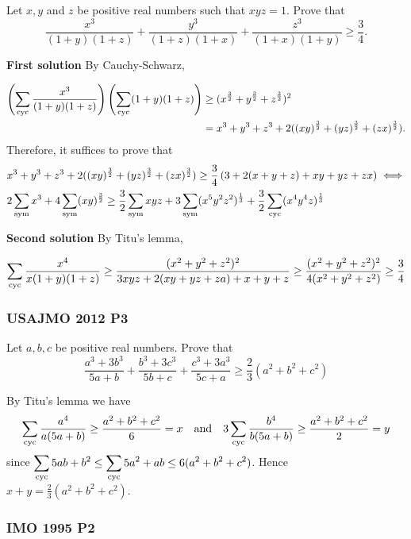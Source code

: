 \begin{problem}
Let $x,y$ and $z$ be positive real numbers such that $xyz=1$. Prove that
\[
	\frac{x^{3}}{(1 + y)(1 + z)}+\frac{y^{3}}{(1 + z)(1 + x)}+\frac{z^{3}}{(1 + x)(1 + y)}
	\geq \frac{3}{4}.
\]
\end{problem}

\textcolor{color1}{\textbf{First solution}} By Cauchy-Schwarz,

\begin{align*}
	\left(\sum_{\text{cyc}} \frac{x^3}{(1+y)(1+z)}\right)\left(\sum_{\text{cyc}} (1+y)(1+z)\right) & \geq (x^{\frac{3}{2}}
	+ y^{\frac{3}{2}} + z^{\frac{3}{2}})^2                                                       \\ & = x^3+y^3+z^3+2((xy)^{\frac{3}{2}}+(yz)^{\frac{3}{2}}+(zx)^{\frac{3}{2}}).
\end{align*}
Therefore, it suffices to prove that
\begin{align*}
	 & x^3+y^3+z^3+2((xy)^{\frac{3}{2}}+(yz)^{\frac{3}{2}}+(zx)^{\frac{3}{2}}) \geq \frac{3}{4}\left(3+2(x+y+z)+xy+yz+zx \right) \iff            \\
	 & 2 \sum_{\text{sym}} x^3 +4 \sum_{\text{sym}} (xy)^{\frac{3}{2}} \geq \frac{3}{2} \sum_{\text{sym}} xyz + 3 \sum_{\text{sym}}(x^5y^2z^2)^{\frac{1}{3}}+\frac{3}{2} \sum_{\text{cyc}}(x^4y^4z)^{\frac{1}{3}}
\end{align*}

\textcolor{color1}{\textbf{Second solution}} By Titu's lemma,

\[
	\sum_{\text{cyc}} \frac{x^4}{x(1+y)(1+z)} \geq \frac{(x^2+y^2+z^2)^2}{3xyz+2(xy+yz+za)+x+y+z} \geq \frac{(x^2+y^2+z^2)^2}{4(x^2+y^2+z^2)} \geq \frac{3}{4}
\]
\clearpage
\subsubsection{USAJMO 2012 P3}

\begin{problem}
Let $a,b,c$ be positive real numbers. Prove that
\[
	\frac{a^3+3b^3}{5a+b}+\frac{b^3+3c^3}{5b+c}+\frac{c^3+3a^3}{5c+a} \geq \frac{2}{3}(a^2+b^2+c^2)
\]
\end{problem}

By Titu's lemma we have
\[
	\sum_{\text{cyc}} \frac{a^4}{a(5a+b)} \geq \frac{a^2+b^2+c^2}{6} = x \quad \text{and} \quad
	3 \sum_{\text{cyc}} \frac{b^4}{b(5a+b)} \geq \frac{a^2+b^2+c^2}{2} = y
\]
since $\displaystyle \sum_{\text{cyc}} 5ab+b^2 \leq \sum_{\text{cyc}} 5a^2+ab \leq 6(a^2+b^2+c^2)$. Hence $\displaystyle x+y=\frac{2}{3}(a^2+b^2+c^2)$.
\clearpage

\subsubsection{IMO 1995 P2}

